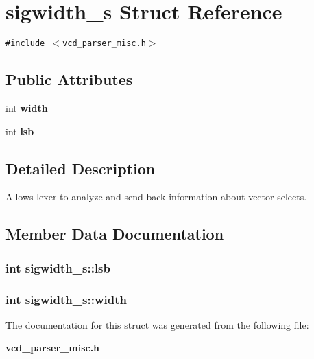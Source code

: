 \section{sigwidth\_\-s  Struct Reference}
\label{structsigwidth__s}
{\tt \#include $<$vcd\_\-parser\_\-misc.h$>$}

\subsection*{Public Attributes}
\begin{CompactItemize}
\item 
int {\bf width}
\item 
int {\bf lsb}
\end{CompactItemize}


\subsection{Detailed Description}
Allows lexer to analyze and send back information about vector selects. 



\subsection{Member Data Documentation}
\subsubsection{\setlength{\rightskip}{0pt plus 5cm}int sigwidth\_\-s::lsb}\label{structsigwidth__s_m1}


\subsubsection{\setlength{\rightskip}{0pt plus 5cm}int sigwidth\_\-s::width}\label{structsigwidth__s_m0}




The documentation for this struct was generated from the following file:\begin{CompactItemize}
\item 
{\bf vcd\_\-parser\_\-misc.h}\end{CompactItemize}
